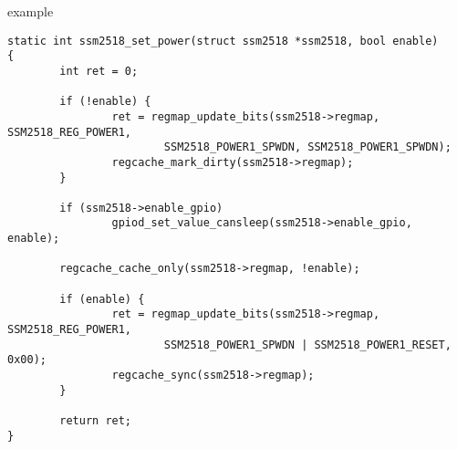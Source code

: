 \begin{frame}[fragile]{ example}
  \begin{block}{}
    \fontsize{8}{8}\selectfont
    \begin{verbatim}
static int ssm2518_set_power(struct ssm2518 *ssm2518, bool enable)
{
        int ret = 0;

        if (!enable) {
                ret = regmap_update_bits(ssm2518->regmap, SSM2518_REG_POWER1,
                        SSM2518_POWER1_SPWDN, SSM2518_POWER1_SPWDN);
                regcache_mark_dirty(ssm2518->regmap);
        }

        if (ssm2518->enable_gpio)
                gpiod_set_value_cansleep(ssm2518->enable_gpio, enable);

        regcache_cache_only(ssm2518->regmap, !enable);

        if (enable) {
                ret = regmap_update_bits(ssm2518->regmap, SSM2518_REG_POWER1,
                        SSM2518_POWER1_SPWDN | SSM2518_POWER1_RESET, 0x00);
                regcache_sync(ssm2518->regmap);
        }

        return ret;
}
    \end{verbatim}
  \end{block}
\end{frame}
